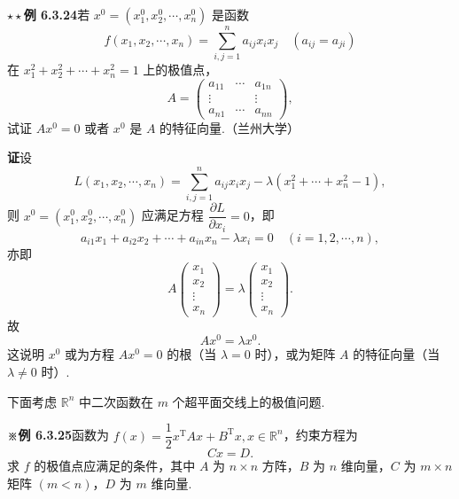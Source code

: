 \documentclass[UTF8,12pt,a4paper,fontset=fandol]{ctexart}
\begin{document}
\noindent\textbf{\ensuremath{\star\star}例 6.3.24}\quad 若 $x^0=(x_1^0,x_2^0,\cdots,x_n^0)$ 是函数
\[
  f(x_1,x_2,\cdots,x_n)=\sum_{i,j=1}^n a_{ij}x_ix_j\quad(a_{ij}=a_{ji})
\]
在 $x_1^2+x_2^2+\cdots+x_n^2=1$ 上的极值点，
\[
  A=\begin{pmatrix}
    a_{11}&\cdots&a_{1n}\\
    \vdots&&\vdots\\
    a_{n1}&\cdots&a_{nn}
  \end{pmatrix},
\]
试证 $Ax^0=0$ 或者 $x^0$ 是 $A$ 的特征向量.（兰州大学）

\noindent\textbf{证}\quad 设
\[
  L(x_1,x_2,\cdots,x_n)=\sum_{i,j=1}^n a_{ij}x_ix_j-\lambda(x_1^2+\cdots+x_n^2-1),
\]
则 $x^0=(x_1^0,x_2^0,\cdots,x_n^0)$ 应满足方程 $\dfrac{\partial L}{\partial x_i}=0$，即
\[
  a_{i1}x_1+a_{i2}x_2+\cdots+a_{in}x_n-\lambda x_i=0
  \quad(i=1,2,\cdots,n),
\]
亦即
\[
  A\begin{pmatrix}
    x_1\\x_2\\ \vdots\\x_n
  \end{pmatrix}
  =
  \lambda\begin{pmatrix}
    x_1\\x_2\\ \vdots\\x_n
  \end{pmatrix}.
\]
故
\[
  Ax^0=\lambda x^0.
\]
这说明 $x^0$ 或为方程 $Ax^0=0$ 的根（当 $\lambda=0$ 时），或为矩阵 $A$ 的特征向量（当 $\lambda\ne0$ 时）.

下面考虑 $\mathbb{R}^n$ 中二次函数在 $m$ 个超平面交线上的极值问题.

\noindent\textbf{※例 6.3.25}\quad 函数为 $f(x)=\dfrac12x^{\mathrm T}Ax+B^{\mathrm T}x,x\in\mathbb{R}^n$，约束方程为
\[
  Cx=D. \tag{1}
\]
求 $f$ 的极值点应满足的条件，其中 $A$ 为 $n\times n$ 方阵，$B$ 为 $n$ 维向量，$C$ 为 $m\times n$ 矩阵 $(m<n)$，$D$ 为 $m$ 维向量.
\end{document}
